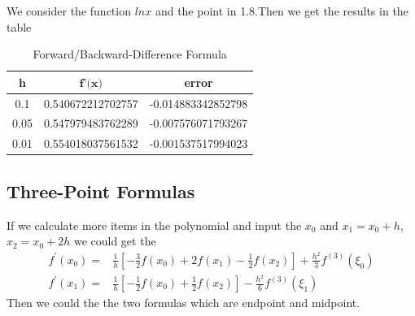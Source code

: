 \documentclass{article}
\begin{document}
We consider the function $lnx$ and the point in 1.8.Then we get the results in the table
\begin{table}[!ht]
    \centering
    \begin{tabular}{|c|c|c|}
    \hline
        \textbf{h} & $\textbf{f'(x)}$ & \textbf{error} \\ \hline
        0.1 &    0.540672212702757  &   -0.014883342852798  \\ \hline
        0.05 &    0.547979483762289  &   -0.007576071793267  \\ \hline
        0.01 &    0.554018037561532  &   -0.001537517994023  \\ \hline
    \end{tabular}
    \caption{Forward/Backward-Difference Formula}
    \label{FBT}
\end{table}

\subsection{Three-Point Formulas}
If we calculate more items in the polynomial and input the $x_0$ and $x_1=x_0+h$,$x_2=x_0+2h$ we could get the 
\begin{align}
    f^{\prime}\left(x_{0}\right)=&\frac{1}{h}\left[-\frac{3}{2} f\left(x_{0}\right)+2 f\left(x_{1}\right)-\frac{1}{2} f\left(x_{2}\right)\right]+\frac{h^{2}}{3} f^{(3)}\left(\xi_{0}\right)\nonumber\\
    f^{\prime}\left(x_{1}\right)=&\frac{1}{h}\left[-\frac{1}{2} f\left(x_{0}\right)+\frac{1}{2} f\left(x_{2}\right)\right]-\frac{h^{2}}{6} f^{(3)}\left(\xi_{1}\right)\nonumber
\end{align}
Then we could the the two formulas which are endpoint and midpoint.
\end{document}
